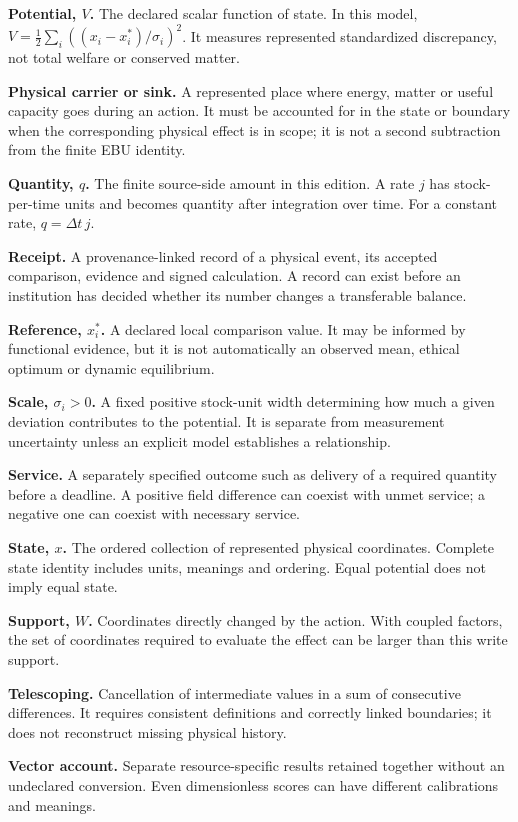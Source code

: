 \textbf{Potential, $V$.} The declared scalar function of state. In this model, $V=\frac12\sum_i((x_i-x_i^*)/\sigma_i)^2$. It measures represented standardized discrepancy, not total welfare or conserved matter.

\textbf{Physical carrier or sink.} A represented place where energy, matter or useful capacity goes during an action. It must be accounted for in the state or boundary when the corresponding physical effect is in scope; it is not a second subtraction from the finite EBU identity.

\textbf{Quantity, $q$.} The finite source-side amount in this edition. A rate $j$ has stock-per-time units and becomes quantity after integration over time. For a constant rate, $q=\Delta t\,j$.

\textbf{Receipt.} A provenance-linked record of a physical event, its accepted comparison, evidence and signed calculation. A record can exist before an institution has decided whether its number changes a transferable balance.

\textbf{Reference, $x_i^*$.} A declared local comparison value. It may be informed by functional evidence, but it is not automatically an observed mean, ethical optimum or dynamic equilibrium.

\textbf{Scale, $\sigma_i>0$.} A fixed positive stock-unit width determining how much a given deviation contributes to the potential. It is separate from measurement uncertainty unless an explicit model establishes a relationship.

\textbf{Service.} A separately specified outcome such as delivery of a required quantity before a deadline. A positive field difference can coexist with unmet service; a negative one can coexist with necessary service.

\textbf{State, $x$.} The ordered collection of represented physical coordinates. Complete state identity includes units, meanings and ordering. Equal potential does not imply equal state.

\textbf{Support, $W$.} Coordinates directly changed by the action. With coupled factors, the set of coordinates required to evaluate the effect can be larger than this write support.

\textbf{Telescoping.} Cancellation of intermediate values in a sum of consecutive differences. It requires consistent definitions and correctly linked boundaries; it does not reconstruct missing physical history.

\textbf{Vector account.} Separate resource-specific results retained together without an undeclared conversion. Even dimensionless scores can have different calibrations and meanings.

